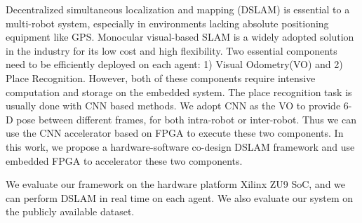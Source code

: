 Decentralized simultaneous localization and mapping (DSLAM) is essential to a multi-robot system, especially in environments lacking absolute positioning equipment like GPS.
Monocular visual-based SLAM is a widely adopted solution in the industry for its low cost and high flexibility.
Two essential components need to be efficiently deployed on each agent: 1) Visual Odometry(VO) and 2) Place Recognition. However, both of these components require intensive computation and storage on the embedded system.
The place recognition task is usually done with CNN based methods. We adopt CNN as the VO to provide 6-D pose between different frames, for both intra-robot or inter-robot. Thus we can use the CNN accelerator based on FPGA to execute these two components.
In this work, we propose a hardware-software co-design DSLAM framework and use embedded FPGA to accelerator these two components.

We evaluate our framework on the hardware platform Xilinx ZU9 SoC, and we can perform DSLAM in real time on each agent. We also evaluate our system on the publicly available dataset.